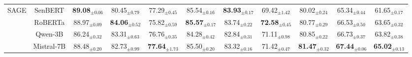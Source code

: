 \begin{table*}[!t]
{\begin{tabular}{cc|ccccccccc}
     \multirow{4}{*}{SAGE} & SenBERT & \cellcolor{blue!10}\textbf{89.08$_{\pm \text{0.06}}$} & 80.45$_{\pm \text{0.79}}$ & 77.29$_{\pm \text{0.45}}$ & 85.54$_{\pm \text{0.16}}$ & \cellcolor{blue!10} \textbf{83.93$_{\pm \text{0.17}}$} & 69.42$_{\pm \text{1.42}}$ & 80.02$_{\pm \text{0.24}}$ & 65.34$_{\pm \text{0.44}}$ & 61.65$_{\pm \text{0.17}}$ \\ 
    & RoBERTa & 88.97$_{\pm \text{0.09}}$ & \cellcolor{blue!10} \textbf{84.06$_{\pm \text{0.52}}$} & 75.82$_{\pm \text{0.59}}$ & \cellcolor{blue!10} \textbf{85.57$_{\pm \text{0.17}}$} & 83.74$_{\pm \text{0.22}}$ & \cellcolor{blue!10}\textbf{72.58$_{\pm \text{0.45}}$} & 80.77$_{\pm \text{0.29}}$ & 66.53$_{\pm \text{0.50}}$ & 63.65$_{\pm \text{0.32}}$ \\ 
    & Qwen-3B & 86.24$_{\pm \text{0.32}}$ & 83.31$_{\pm \text{0.63}}$ & 76.76$_{\pm \text{0.35}}$ & 84.28$_{\pm \text{0.42}}$ & 82.84$_{\pm \text{0.31}}$ & 71.11$_{\pm \text{0.98}}$ & 80.85$_{\pm \text{0.22}}$ & 66.73$_{\pm \text{0.37}}$ & 63.82$_{\pm \text{0.38}}$ \\ 
    & Mistral-7B & 88.48$_{\pm \text{0.20}}$ & 82.73$_{\pm \text{0.99}}$ & \cellcolor{blue!10} \textbf{77.64$_{\pm \text{1.73}}$} & 85.50$_{\pm \text{0.20}}$ & 83.32$_{\pm \text{0.16}}$ & 71.42$_{\pm \text{0.47}}$ & \cellcolor{blue!10} \textbf{81.47$_{\pm \text{0.32}}$} & \cellcolor{blue!10}\textbf{67.44$_{\pm \text{0.06}}$} &  \cellcolor{blue!10} \textbf{65.02$_{\pm \text{0.13}}$} \\ 
    \bottomrule
    \end{tabular}
    }
    \label{tab:encoder_comp}
\end{table*}




